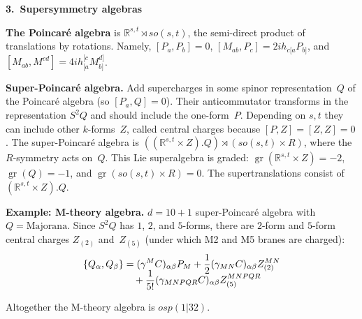 \documentclass[10pt,letterpaper]{article}
\def\mysection #1#2{\medskip\pagebreak[1]\noindent\textbf{\large #1.\ #2}\smallskip}
\def\myparagraph #1{\textbf{#1}}
\begin{document}
\mysection{3}{Supersymmetry algebras}

\myparagraph{The Poincar\'e algebra} is $\mathbb{R}^{s,t} \rtimes so(s,t)$, the semi-direct product of translations by rotations.
Namely, $[P_{a},P_{b}]=0$, $[M_{ab},P_{c}]=2ih_{c[a}P_{b]}$, and $[M_{ab},M^{cd}]=4ih_{[a}^{[c}M_{b]}^{d]}$.

\smallskip

\myparagraph{Super-Poincar\'e algebra.}
Add supercharges in some spinor representation~$Q$ of the Poincar\'e algebra (so $[P_{a},Q]=0$).
Their anticommutator transforms in the representation $S^2 Q$ and should include the one-form~$P$.
Depending on $s,t$ they can include other $k$-forms~$Z$, called central charges because $[P,Z]=[Z,Z]=0$.
The super-Poincar\'e algebra is $((\mathbb{R}^{s,t}\times Z).Q)\rtimes (so(s,t)\times R)$, where the $R$-symmetry acts on~$Q$.
This Lie superalgebra is graded: $\operatorname{gr}(\mathbb{R}^{s,t}\times Z)=-2$, $\operatorname{gr}(Q)=-1$, and $\operatorname{gr}(so(s,t)\times R)=0$.
The supertranslations consist of $(\mathbb{R}^{s,t}\times Z).Q$.

\smallskip

\myparagraph{Example: M-theory algebra.}  $d=10+1$ super-Poincar\'e algebra with $Q=\text{Majorana}$.
Since $S^2 Q$ has $1$, $2$, and $5$-forms, there are $2$-form and $5$-form central charges $Z_{(2)}$ and~$Z_{(5)}$
(under which M2 and M5 branes are charged):
\vspace{-.5\baselineskip}
\begin{align*}
\{Q_{\alpha},Q_{\beta}\}&=(\gamma^{M}C)_{\alpha\beta} P_{M}+\frac{1}{2}(\gamma_{MN}C)_{\alpha\beta} Z_{(2)}^{MN}\\[-.5\baselineskip]
& \quad + \frac{1}{5!}(\gamma_{MNPQR}C)_{\alpha\beta} Z_{(5)}^{MNPQR}
\end{align*}
\vspace{-1\baselineskip}

\noindent Altogether the M-theory algebra is $osp(1|32)$.

\smallskip
\end{document}
